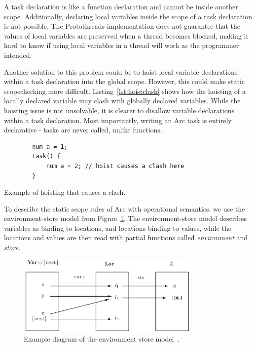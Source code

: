 A task declaration is like a function declaration and cannot be inside another scope. Additionally, declaring local variables inside the scope of a task declaration is not possible. The Protothreads implementation does not guarantee that the values of local variables are preserved when a thread becomes blocked, making it hard to know if using local variables in a thread will work as the programmer intended.

Another solution to this problem could be to hoist local variable declarations within a task declaration into the global scope. However, this could make static scopechecking more difficult. Listing~\ref{lst:hoistclash} shows how the hoisting of a locally declared variable may clash with globally declared variables. While the hoisting issue is not unsolvable, it is clearer to disallow variable declarations within a task declaration. Most importantly, writing an Arc task is entirely declarative - tasks are never called, unlike functions.


\begin{listing}[htb!]
    \begin{verbatim}
        num a = 1;
        task() {
            num a = 2; // hoist causes a clash here
        }
    \end{verbatim}
    \caption{Example of hoisting that causes a clash.}
    \label{lst:hoistclash}
\end{listing}


To describe the static scope rules of Arc with operational semantics, we use the environment-store model from Figure~\ref{fig:envstomodel}. The environment-store model describes variables as binding to locations, and locations binding to values, while the locations and values are then read with partial functions called \textit{environment} and \textit{store}.


\begin{figure}[htb!]
    \centering
    \includegraphics[width=0.8\textwidth]{figures/Environment_Store.png}
    \caption{Example diagram of the environment store model~\cite{Huttel2010}.}
    \label{fig:envstomodel}
\end{figure}


